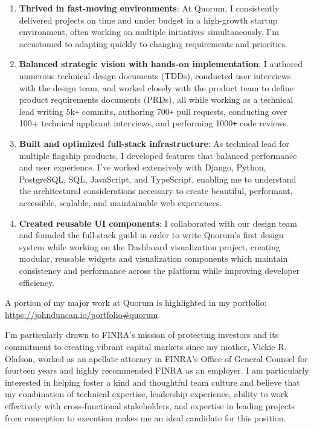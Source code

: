 \documentclass[]{article}
\def\Plus{\texttt{+}}
\begin{document}
\begin{enumerate}
  Other projects of similar scope and complexity are listed in my full CV: \url{https://johnduncan.io/cv.pdf}.
  \item \textbf{Thrived in fast-moving environments}: At Quorum, I consistently delivered projects on time and under budget in a high-growth startup environment, often working on multiple initiatives simultaneously. I'm accustomed to adapting quickly to changing requirements and priorities.
  \item \textbf{Balanced strategic vision with hands-on implementation}: I authored numerous technical design documents (TDDs), conducted user interviews with the design team, and worked closely with the product team to define product requirements documents (PRDs), all while working as a technical lead writing 5k{\Plus} commits, authoring 700{\Plus} pull requests, conducting over 100+ technical applicant interviews, and performing 1000{\Plus} code reviews.
  \item \textbf{Built and optimized full-stack infrastructure}: As technical lead for multiple flagship products, I developed features that balanced performance and user experience. I've worked extensively with Django, Python, PostgreSQL, SQL, JavaScript, and TypeScript, enabling me to understand the architectural considerations necessary to create beautiful, performant, accessible, scalable, and maintainable web experiences.
  \item \textbf{Created reusable UI components}: I collaborated with our design team and founded the full-stack guild in order to write Quorum's first design system while working on the Dashboard visualization project, creating modular, reusable widgets and visualization components which maintain consistency and performance across the platform while improving developer efficiency.
\end{enumerate}

A portion of my major work at Quorum is highlighted in my portfolio: \url{https://johnduncan.io/portfolio#quorum}.

I'm particularly drawn to FINRA's mission of protecting investors and its commitment to creating vibrant capital markets since my mother, Vickie R. Olafson, worked as an apellate attorney in FINRA's Office of General Counsel for fourteen years and highly recommended FINRA as an employer. I am particularly interested in helping foster a kind and thoughtful team culture and believe that my combination of technical expertise, leadership experience, ability to work effectively with cross-functional stakeholders, and expertise in leading projects from conception to execution makes me an ideal candidate for this position.
\end{document}
